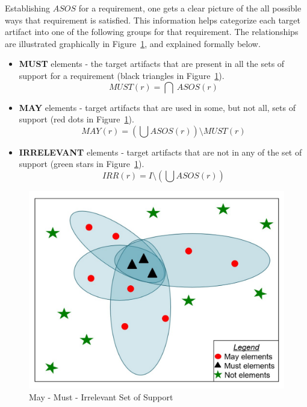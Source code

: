 Establishing $ASOS$ for a requirement, one gets a clear picture of the all possible ways that requirement is satisfied. This information helps categorize each target artifact into one of the following groups for that requirement.  The relationships are illustrated graphically in Figure~\ref{fig:maymust}, and explained formally below.
\begin{itemize}
  \item \textbf{MUST} elements - the target artifacts that are present in all the sets of support for a requirement (black triangles in Figure~\ref{fig:maymust}).
      $$ MUST (r) = \bigcap \ ASOS(r) $$

  \item \textbf{MAY} elements - target artifacts that are used in some, but not all, sets of support (red dots in Figure~\ref{fig:maymust}).
      $$MAY(r) = (\bigcup ASOS (r)) \setminus MUST (r) $$

  \item \textbf{IRRELEVANT} elements - target artifacts that are not in any of the set of support (green stars in Figure~\ref{fig:maymust}). $$IRR(r) = I \setminus (\bigcup ASOS (r))$$
\end{itemize}

\begin{figure}[htb]
\includegraphics[width=\columnwidth]{images/may_must.pdf}
\caption{May - Must - Irrelevant Set of Support}\label{fig:maymust}
\end{figure}

